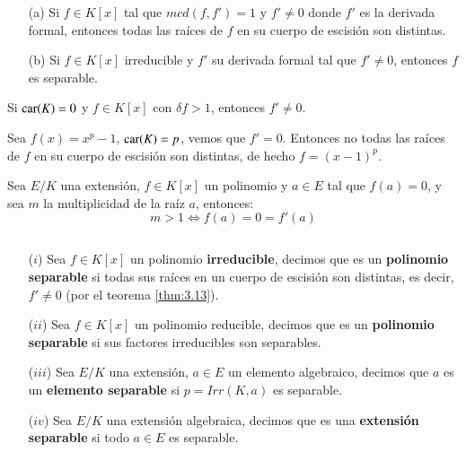 \begin{thm}\label{thm:3.13}\label{thm:3.4.1}$ $
    \begin{itemize}
        \item[(a)] Si $f \in K[x]$ tal que $mcd(f, f') = 1$ y $f' \neq 0$ donde $f'$ es la derivada formal, entonces todas las raíces de $f$ en su cuerpo de escisión son distintas.
        \item[(b)] Si $f \in K[x]$ irreducible y $f'$ su derivada formal tal que $f' \neq 0$, entonces $f$ es separable.
    \end{itemize}
\end{thm}
\begin{obs}
    Si $\mathrm{car}(K) = 0$ y $f\in K[x]$ con $\delta f > 1$, entonces $f' \neq 0$.
\end{obs}

\begin{eg}
    Sea $f(x) = x^p -1$, $\mathrm{car}(K) = p$, vemos que $f' = 0$. Entonces no todas las raíces de $f$ en su cuerpo de escisión son distintas, de hecho $f = (x-1)^p$.
\end{eg}

\begin{pro}\label{pro:3.4.2}
    Sea $E/K$ una extensión, $f \in K[x]$  un polinomio y $a \in E$ tal que $f(a) = 0$, y sea $m$ la multiplicidad de la raíz $a$, entonces:
    $$
        m > 1 \iff f(a)=0=f'(a)
    $$
\end{pro}

\begin{dfn}$ $
    \begin{itemize}
        \item[($i$)] Sea $f \in K[x]$ un polinomio \textbf{irreducible}, decimos que es un \textbf{polinomio separable} si todas sus raíces en un cuerpo de escisión son distintas, es decir, $f' \neq 0$ (por el teorema \ref{thm:3.13}).
        \item[($ii$)] Sea $f \in K[x]$ un polinomio reducible, decimos que es un \textbf{polinomio separable} si sus factores irreducibles son separables.
        \item[($iii$)] Sea $E/K$ una extensión, $a \in E$ un elemento algebraico, decimos que $a$ es un \textbf{elemento separable} si $p = Irr(K, a)$ es separable.
        \item[($iv$)] Sea $E/K$ una extensión algebraica, decimos que es una \textbf{extensión separable} si todo $a \in E$ es separable.
    \end{itemize}
\end{dfn}

